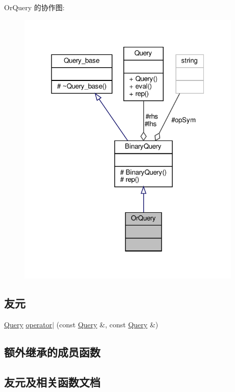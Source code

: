 Or\+Query 的协作图\+:\nopagebreak
\begin{figure}[H]
\begin{center}
\leavevmode
\includegraphics[width=304pt]{classOrQuery__coll__graph}
\end{center}
\end{figure}
\subsection*{友元}
\begin{DoxyCompactItemize}
\item 
\hyperlink{classQuery}{Query} \hyperlink{classOrQuery_a51852e29f84c14afd70921a21cab6074}{operator$\vert$} (const \hyperlink{classQuery}{Query} \&, const \hyperlink{classQuery}{Query} \&)
\end{DoxyCompactItemize}
\subsection*{额外继承的成员函数}


\subsection{友元及相关函数文档}
\mbox{\label{classOrQuery_a51852e29f84c14afd70921a21cab6074}} 
